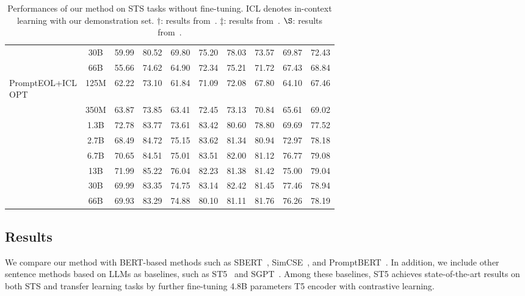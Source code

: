 \documentclass{article}
\begin{document}
\begin{table*}[t]
{\begin{tabular}{lccccccccc}
& 30B &  59.99 & 80.52 & 69.80 & 75.20 & 78.03 & 73.57 & 69.87 & 72.43\\
& 66B &  55.66 & 74.62 & 64.90 & 72.34 & 75.21 & 71.72 & 67.43 & 68.84 \\
\midrule
\multirowcell{8}[0pt][l]{PromptEOL+ICL\\OPT}
 &  125M& 62.22 & 73.10 & 61.84 & 71.09 & 72.08 & 67.80 & 64.10 & 67.46 \\
 &  350M& 63.87 & 73.85 & 63.41 & 72.45 & 73.13 & 70.84 & 65.61 & 69.02 \\
 &  1.3B& 72.78 & 83.77 & 73.61 & 83.42 & 80.60 & 78.80 & 69.69 & 77.52 \\
 &  2.7B& 68.49 & 84.72 & 75.15 & 83.62 & 81.34 & 80.94 & 72.97 & 78.18 \\
 &  6.7B\cellcolor{lightcyan}& 70.65\cellcolor{lightcyan} & 84.51\cellcolor{lightcyan} & 75.01\cellcolor{lightcyan} & 83.51\cellcolor{lightcyan} & 82.00\cellcolor{lightcyan} & 81.12\cellcolor{lightcyan} & 76.77\cellcolor{lightcyan} & 79.08\cellcolor{lightcyan} \\
 &  13B & 71.99 & 85.22 & 76.04 & 82.23 & 81.38 & 81.42 & 75.00 & 79.04 \\
 &  30B & 69.99 & 83.35 & 74.75 & 83.14 & 82.42 & 81.45 & 77.46 & 78.94 \\
 &  66B & 69.93 & 83.29 & 74.88 & 80.10 & 81.11 & 81.76 & 76.26 & 78.19 \\

\bottomrule
\end{tabular}
}
\caption{ Performances of our method on STS tasks without fine-tuning. ICL denotes in-context learning with our demonstration set.
\(\dagger\): results from~\cite{gao2021simcse}.
  \(\ddagger \): results from~\cite{jiang2022promptbert}.
  \(\S\): results from~\cite{sentencet5}.
}\label{tab:sts_wo_ft}
\vspace{-10pt}
\end{table*}

\subsection{Results}
We compare our method with BERT-based methods such as SBERT~\cite{reimers2019sentence}, SimCSE~\cite{gao2021simcse}, and PromptBERT~\cite{jiang2022promptbert}. In addition, we include other sentence methods based on LLMs as baselines, such as ST5~\cite{sentencet5} and SGPT~\cite{muennighoff2022sgpt}.
Among these baselines, ST5 achieves state-of-the-art results on both STS and transfer learning tasks by further fine-tuning 4.8B parameters T5 encoder  with contrastive learning.
\end{document}
